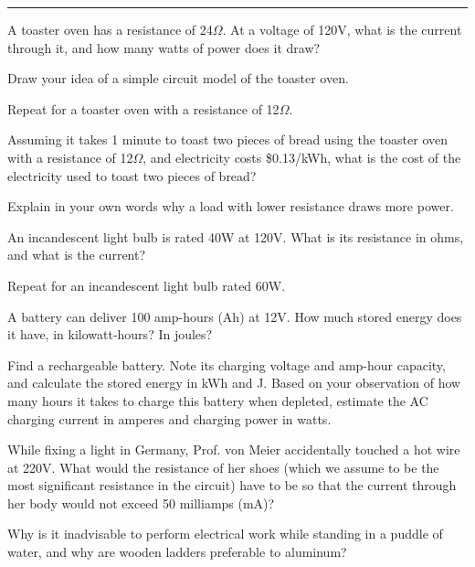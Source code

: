 \documentclass{article}
\begin{document}
\hrule
\vspace{10pt}




\subproblem
A toaster oven has a resistance of 24$\Omega$.  At a voltage of 120V,
what is the current through it, and how many watts of power does it
draw?

\subproblem
Draw your idea of a simple circuit model of the toaster oven.

\subproblem
Repeat for a toaster oven with a resistance of 12$\Omega$.

\subproblem
Assuming it takes 1 minute to toast two pieces of bread using the
toaster oven with a resistance of 12$\Omega$, and electricity costs
\$0.13/kWh, what is the cost of the electricity used to toast two
pieces of bread?

\subproblem
Explain in your own words why a load with lower resistance draws
more power.




\subproblem
An incandescent light bulb is rated 40W at 120V.  What is its
resistance in ohms, and what is the current?

\subproblem
Repeat for an incandescent light bulb rated 60W.



\subproblem
A battery can deliver 100 amp-hours (Ah) at 12V.  How much stored
energy does it have, in kilowatt-hours?  In joules?

\subproblem
Find a rechargeable battery. Note its charging voltage and
amp-hour capacity, and calculate the stored energy in kWh and J.
Based on your observation of how many hours it takes to charge this
battery when depleted, estimate the AC charging current in amperes and
charging power in watts.


\subproblem
While fixing a light in Germany, Prof. von Meier accidentally
touched a hot wire at 220V.  What would the resistance of her shoes
(which we assume to be the most significant resistance in the
circuit) have to be so that the current through her body would not
exceed 50 milliamps (mA)?

\subproblem
Why is it inadvisable to perform electrical work while standing
in a puddle of water, and why are wooden ladders preferable to
aluminum?
\end{document}
